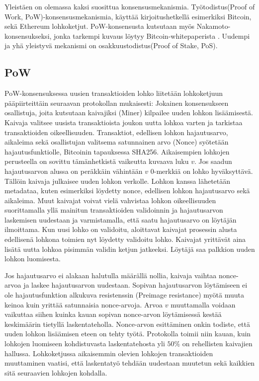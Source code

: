 Yleistäen on olemassa kaksi suosittua konsensusmekanismia. Työtodistus(Proof of Work, PoW)-konsensusmekanismia, käyttää kirjoitushetkellä esimerkiksi Bitcoin, sekä Ethereum lohkoketjut. PoW-konsensusta kutsutaan myös Nakamoto-konsensukseksi, jonka tarkempi kuvaus löytyy Bitcoin-whitepaperista \cite{Nakamoto_bitcoin}. Uudempi ja yhä yleistyvä mekanismi on  osakkuustodistus(Proof of Stake, PoS). 

\subsection{PoW}
PoW-konsensuksessa uusien transaktioiden lohko liitetään lohkoketjuun pääpiirteittäin seuraavan protokollan mukaisesti: Jokainen konsensukseen osallistuja, joita kutsutaan kaivajiksi (Miner) kilpailee uuden lohkon lisäämisestä. Kaivaja valitsee uusista transaktioista joukon uutta lohkoa varten ja tarkistaa transaktioiden oikeellisuuden. Transaktiot, edellisen lohkon hajautusarvo, aikaleima sekä osallistujan valitsema satunnainen arvo (Nonce) syötetään hajautusfunktiolle, Bitcoinin tapauksessa SHA256. Aikaisempien lohkojen perusteella on sovittu tämänhetkistä vaikeutta kuvaava luku $v$. Jos saadun hajautusarvon alussa on peräkkäin vähintään $v$ 0-merkkiä on lohko hyväksyttävä. Tällöin kaivaja julkaisee uuden lohkon verkolle. Lohkon kanssa lähetetään metadataa, kuten esimerkiksi löydetty nonce, edellisen lohkon hajautusarvo sekä aikaleima. Muut kaivajat voivat vielä vahvistaa lohkon oikeellisuuden suorittamalla yllä mainitun transaktioiden validoinnin ja hajautusarvon laskemisen uudestaan ja varmistamalla, että saatu hajautusarvo on löytäjän ilmoittama. Kun uusi lohko on validoitu, aloittavat kaivajat prosessin alusta edellisenä lohkona toimien nyt löydetty validoitu lohko. Kaivajat yrittävät aina lisätä uutta lohkoa pisimmän validin ketjun jatkeeksi. Löytäjä saa palkkion uuden lohkon luomisesta.

Jos hajautusarvo ei alakaan halutulla määrällä nollia, kaivaja vaihtaa nonce-arvoa ja laskee hajautusarvon uudestaan. Sopivan hajautusarvon löytämiseen ei ole hajautusfunktion alkukuva resistenssin (Preimage resistance) myötä muuta keinoa kuin yrittää satunnaisia nonce-arvoja. Arvoa $v$ muuttamalla voidaan vaikuttaa siihen kuinka kauan sopivan nonce-arvon löytämisessä kestää keskimäärin tietyllä laskentateholla. Nonce-arvon esittäminen onkin todiste, että uuden lohkon lisäämisen eteen on tehty työtä. Protokolla toimii niin kauan, kuin lohkojen luomiseen kohdistuvasta laskentatehosta yli $50 \%$ on rehellisten kaivajien hallussa. Lohkoketjussa aikaisemmin olevien lohkojen transaktioiden muuttaminen vaatisi, että laskentatyö tehdään uudestaan muutetun sekä kaikkien sitä seuraavien lohkojen kohdalla.

